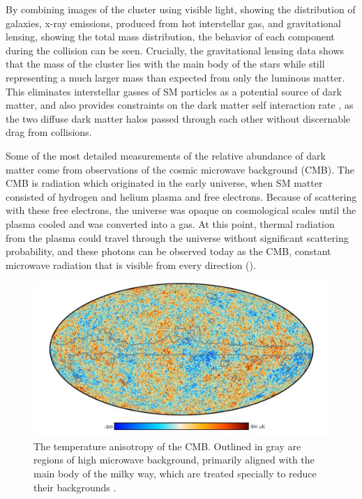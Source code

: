 By combining images of the cluster using visible light, showing the distribution of galaxies, x-ray emissions, produced from hot interstellar gas, and gravitational lensing, showing the total mass distribution, the behavior of each component during the collision can be seen. 
Crucially, the gravitational lensing data shows that the mass of the cluster lies with the main body of the stars while still representing a much larger mass than expected from only the luminous matter. 
This eliminates interstellar gasses of SM particles as a potential source of dark matter, and also provides constraints on the dark matter self interaction rate \cite{Randall_2008}, as the two diffuse dark matter halos passed through each other without discernable drag from collisions.

Some of the most detailed measurements of the relative abundance of dark matter come from observations of the cosmic microwave background (CMB).
The CMB is radiation which originated in the early universe, when SM matter consisted of hydrogen and helium plasma and free electrons.
Because of scattering with these free electrons, the universe was opaque on cosmological scales until the plasma cooled and was converted into a gas. 
At this point, thermal radiation from the plasma could travel through the universe without significant scattering probability, and these photons can be observed today as the CMB, constant microwave radiation that is visible from every direction ().

\begin{figure}[htpb]
	\label{fig:CMB}
	\centering
	\includegraphics[width=1.1\textwidth]{figures/cmb.png}
	\caption[The CMB temperature anisotropy]{The temperature anisotropy of the CMB. Outlined in gray are regions of high microwave background, primarily aligned with the main body of the milky way, which are treated specially to reduce their backgrounds \cite{PlanckCMB}.}
\end{figure}


